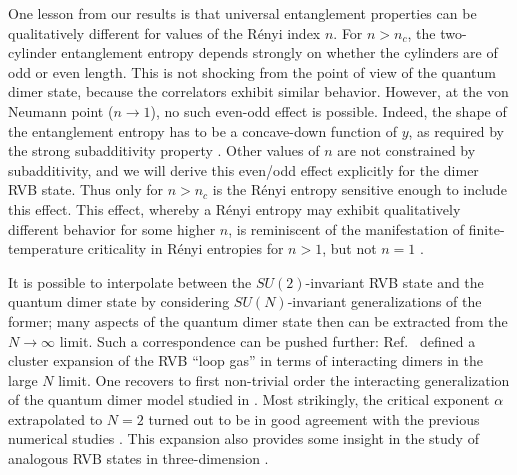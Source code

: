 \documentclass[11pt]{iopart}
\begin{document}
One lesson from our results is that universal entanglement properties can be qualitatively different for values of the R\'enyi index $n$. For $n>n_c$, the two-cylinder entanglement entropy depends strongly on whether the cylinders are of odd or even length. This is not shocking from the point of view of the quantum dimer state, because the correlators exhibit similar behavior. However, at the von Neumann point ($n\to 1$), no such even-odd effect is possible. Indeed, the shape of the entanglement entropy has to be a concave-down function of $y$, as required by the strong subadditivity property \cite{Strongsubadditivity}. Other values of $n$ are not constrained by subadditivity, and we will derive this even/odd effect explicitly for the dimer RVB state. 
Thus only for $n>n_c$ is the R\'enyi entropy sensitive enough to include this effect. 
This effect, whereby a R\'enyi entropy may exhibit qualitatively different behavior for some higher $n$, is reminiscent of the manifestation of finite-temperature criticality in R\'enyi entropies for $n>1$, but not $n=1$ \cite{RenyiXing}. 

It is possible to interpolate between the $SU(2)$-invariant RVB state and the quantum dimer state by considering $SU(N)$-invariant generalizations of the former; many aspects of the quantum dimer state then can be extracted from the $N\to\infty$ limit. Such a correspondence can be pushed further: Ref.~\cite{Damle} defined a cluster expansion of the RVB ``loop gas''\cite{Sutherland_loops} in terms of interacting dimers in the large $N$ limit. One recovers to first non-trivial order the interacting generalization of the quantum dimer model studied in \cite{Alet_dimers1,Alet_dimers2}. Most strikingly, the critical exponent $\alpha$ extrapolated to $N=2$ turned out to be in good agreement with the previous numerical studies \cite{RVB1,RVB2}. This expansion also provides some insight in the study of analogous RVB states in three-dimension \cite{AAM,AMPMJ}.

\end{document}
